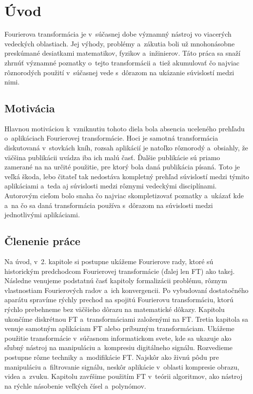 \chapter{Úvod}

Fourierova transformácia je v~súčasnej dobe významný nástroj vo
viacerých vedeckých oblastiach. Jej výhody, problémy a~zákutia boli už
mnohonásobne preskúmané desiatkami matematikov, fyzikov a~inžinierov.
Táto práca sa snaží zhrnúť významné poznatky o~tejto transformácii 
a~tiež akumulovať čo najviac rôznorodých použití v~súčasnej vede
s~dôrazom na ukázanie súvislostí medzi nimi.

\section{Motivácia}
Hlavnou motiváciou k~vzniknutiu tohoto diela bola absencia uceleného
prehľadu o~aplikáciach Fourierovej transformácie. Hoci je samotná
transformácia diskutovaná v~stovkách kníh, rozsah aplikácií je natoľko
rôznorodý a~obsiahly, že väčšina publikácii uvádza iba ich malú časť.
Ďalšie publikácie sú priamo zamerané na na určité použitie, pre ktorý bola daná
publikácia písaná. Toto je veľká škoda, lebo čitateľ tak nedostáva
kompletný prehľad súvislostí medzi týmito aplikáciami a~teda
aj súvislosti medzi rôznymi vedeckými disciplínami. Autorovým
cieľom bolo snaha čo najviac skompletizovať poznatky a~ukázať kde 
a~na čo sa daná transformácia používa s~dôrazom na súvislosti medzi
jednotlivými aplikáciami.

\section{Členenie práce}
Na úvod, v~2. kapitole si postupne ukážeme Fourierove rady, ktoré sú
historickým predchodcom Fourierovej transformácie (ďalej len FT) ako takej.
Následne
venujeme podstatnú časť kapitoly formalizácii problému, rôznym
vlastnostiam Fourierových radov a~ich konvergencii. Po vybudovaní
dostatočného aparátu spravíme rýchly prechod na spojitú Fourierovu
transformáciu, ktorú rýchlo prebehneme bez väčšieho dôrazu na
matematické dôkazy. Kapitolu ukončíme diskrétnou FT a~transformáciami
založenými na FT.
Tretia kapitola sa venuje samotným aplikáciam FT alebo príbuzným
transformáciam.  Ukážeme použitie %
transformácie v~súčasnom informatickom svete, kde sa ukazuje ako
sľubný nástroj na manipuláciu a~kompresiu digitálneho signálu.
Rozvedieme postupne rôzne techniky a~modifikácie FT. Najskôr ako
živnú pôdu pre manipuláciu a~filtrovanie signálu, neskôr aplikácie 
v~oblasti kompresie obrazu, videa a~zvuku. Kapitolu zavŕšime použitím
FT v~teórii algoritmov, ako nástroj na rýchle násobenie veľkých
čísel a~polynómov.
